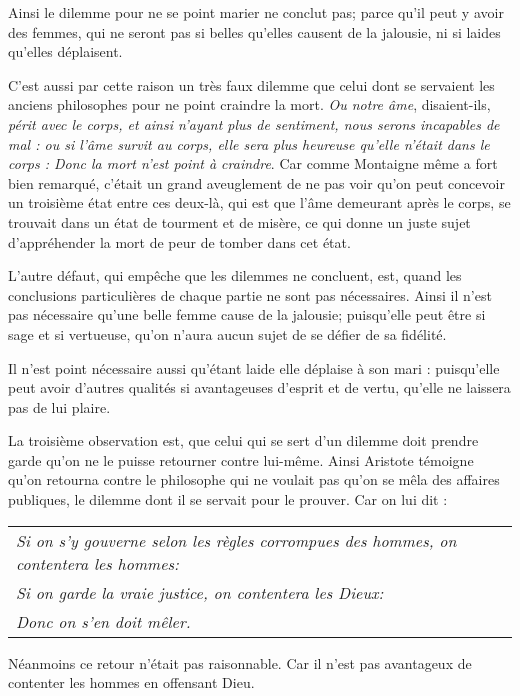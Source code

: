 Ainsi le dilemme pour ne se point marier ne conclut pas; parce qu'il peut y avoir des femmes, qui ne seront pas si belles qu'elles causent de la jalousie, ni si laides qu'elles déplaisent.

C'est aussi par cette raison un très faux dilemme que celui dont se servaient les anciens philosophes pour ne point craindre la mort. \emph{Ou notre âme}, disaient-ils, \emph{périt avec le corps, et ainsi n'ayant plus de sentiment, nous serons incapables de mal : ou si l'âme survit au corps, elle sera plus heureuse qu'elle n'était dans le corps : Donc la mort n'est point à craindre}. Car comme Montaigne même a fort bien remarqué, c'était un grand aveuglement de ne pas voir qu'on peut concevoir un troisième état entre ces deux-là, qui est que l'âme demeurant après le corps, se trouvait dans un état de tourment et de misère, ce qui donne un juste sujet d'appréhender la mort de peur de tomber dans cet état.

L'autre défaut, qui empêche que les dilemmes ne concluent, est, quand les conclusions particulières de chaque partie ne sont pas nécessaires. Ainsi il n'est pas nécessaire qu'une belle femme cause de la jalousie; puisqu'elle peut être si sage et si vertueuse, qu'on n'aura aucun sujet de se défier de sa fidélité.

Il n'est point nécessaire aussi qu'étant laide elle déplaise à son mari : puisqu'elle peut avoir d'autres qualités si avantageuses d'esprit et de vertu, qu'elle ne laissera pas de lui plaire.

La troisième observation est, que celui qui se sert d'un dilemme doit prendre garde qu'on ne le puisse retourner contre lui-même. Ainsi Aristote témoigne qu'on retourna contre le philosophe qui ne voulait pas qu'on se mêla des affaires publiques, le dilemme dont il se servait pour le prouver. Car on lui dit :

	\begin{tabularx}{\textwidth}{X}
		\emph{Si on s'y gouverne selon les règles corrompues des hommes, on contentera les hommes:} \\
		\emph{Si on garde la vraie justice, on contentera les Dieux:} \\
		\emph{Donc on s'en doit mêler.} \\
	\end{tabularx}

Néanmoins ce retour n'était pas raisonnable. Car il n'est pas avantageux de contenter les hommes en offensant Dieu.


